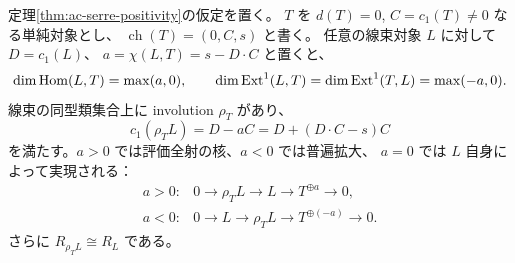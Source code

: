 \begin{theorem}\label{thm:root-line-reflection}
定理\ref{thm:ac-serre-positivity}の仮定を置く。
$T$ を $d(T)=0$, $C=c_1(T)\ne0$ なる単純対象とし、
$\operatorname{ch}(T)=(0,C,s)$ と書く。
任意の線束対象 $L$ に対して $D=c_1(L)$、
$a=\chi(L,T)=s-D\cdot C$ と置くと、
\begin{equation}\label{eq:root-line-hom-ext}
 \dim\operatorname{Hom}(L,T)=\max(a,0),\qquad
 \dim\operatorname{Ext}^1(L,T)=\dim\operatorname{Ext}^1(T,L)=\max(-a,0).
\end{equation}
線束の同型類集合上に involution $\rho_T$ があり、
\begin{equation}\label{eq:root-affine-reflection}
 c_1(\rho_TL)=D-aC=D+(D\cdot C-s)C
\end{equation}
を満たす。$a>0$ では評価全射の核、$a<0$ では普遍拡大、
$a=0$ では $L$ 自身によって実現される：
\[
 \begin{array}{ll}
 a>0:&0\longrightarrow\rho_TL\longrightarrow L
          \longrightarrow T^{\oplus a}\longrightarrow0,\\[2pt]
 a<0:&0\longrightarrow L\longrightarrow\rho_TL
          \longrightarrow T^{\oplus(-a)}\longrightarrow0.
 \end{array}
\]
さらに $R_{\rho_TL}\cong R_L$ である。
\end{theorem}
